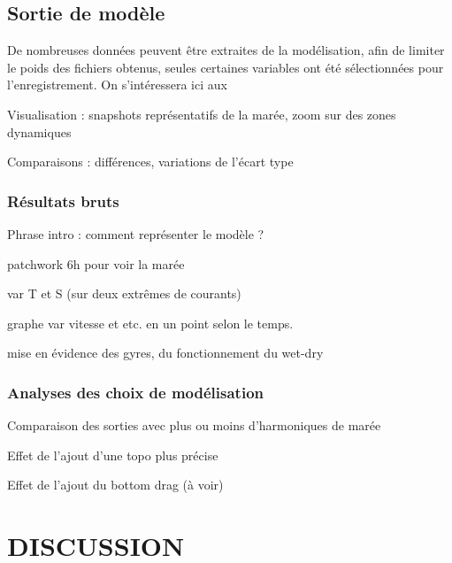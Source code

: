 \documentclass[10pt,a4paper,titlepage]{article}
\begin{document}
\subsection{Sortie de modèle}
\label{sub:sortie_modele}
De nombreuses données peuvent être extraites de la modélisation, afin de limiter le poids des fichiers obtenus, seules certaines variables ont été sélectionnées pour l'enregistrement.
On s'intéressera ici aux


Visualisation : snapshots représentatifs de la marée, zoom sur des zones dynamiques

Comparaisons : différences, variations de l'écart type

\subsubsection{Résultats bruts}
Phrase intro : comment représenter le modèle ?

patchwork 6h pour voir la marée

var T et S (sur deux extrêmes de courants)

graphe var vitesse et etc. en un point selon le temps.

mise en évidence des gyres, du fonctionnement du wet-dry

\subsubsection{Analyses des choix de modélisation}
Comparaison des sorties avec plus ou moins d'harmoniques de marée

Effet de l'ajout d'une topo plus précise

Effet de l'ajout du bottom drag (à voir)

\newpage

\section{DISCUSSION}
\label{sec:discussion}
\end{document}
